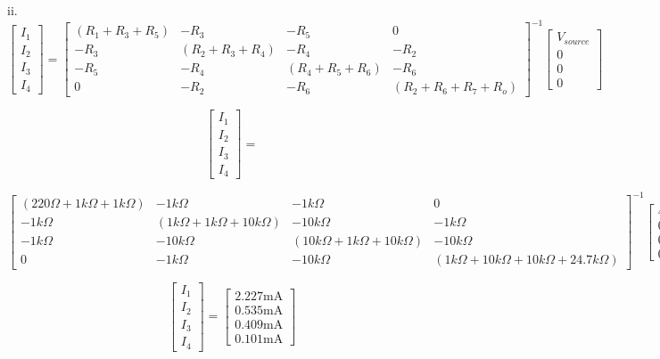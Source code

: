 \documentclass[12pt]{article}
\begin{document}
ii. \\
\[
\begin{bmatrix}
    I_1 \\
    I_2 \\
    I_3 \\
    I_4
\end{bmatrix}
=
\begin{bmatrix}
    (R_1 + R_3 + R_5) & -R_3 & -R_5 & 0 \\
    -R_3 & (R_2 + R_3 + R_4) & -R_4 & -R_2 \\
    -R_5 & -R_4 & (R_4 + R_5 + R_6) & -R_6 \\
    0 & -R_2 & -R_6 & (R_2 + R_6 + R_7 + R_o)
\end{bmatrix} ^{-1}
\begin{bmatrix}
    V_{source} \\
    0 \\
    0 \\
    0
\end{bmatrix}
\]

\[
\begin{bmatrix}
    I_1 \\
    I_2 \\
    I_3 \\
    I_4
\end{bmatrix}
=
\]

\footnotesize
\[
\begin{bmatrix}
    (220\Omega + 1k\Omega + 1k\Omega) & -1k\Omega & -1k\Omega & 0 \\
    -1k\Omega & (1k\Omega + 1k\Omega + 10k\Omega) & -10k\Omega & -1k\Omega \\
    -1k\Omega & -10k\Omega & (10k\Omega + 1k\Omega + 10k\Omega) & -10k\Omega \\
    0 & -1k\Omega & -10k\Omega & (1k\Omega + 10k\Omega + 10k\Omega + 24.7k\Omega)
\end{bmatrix} ^{-1}
\begin{bmatrix}
    4V \\
    0 \\
    0 \\
    0
\end{bmatrix}
\]

\[
\begin{bmatrix}
    I_1 \\
    I_2 \\
    I_3 \\
    I_4
\end{bmatrix}
=
\begin{bmatrix}
    2.227 \text{mA} \\
    0.535 \text{mA} \\
    0.409 \text{mA} \\
    0.101 \text{mA}
\end{bmatrix}
\]
\end{document}

